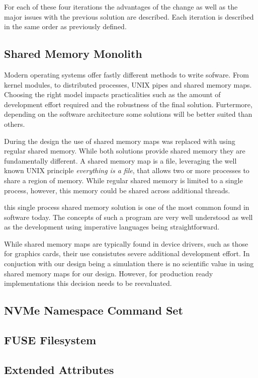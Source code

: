For each of these four iterations the advantages of the change as well as the
major issues with the previous solution are described. Each iteration is
described in the same order as previously defined.

\subsection{Shared Memory Monolith}

Modern operating systems offer fastly different methods to write sofware. From
kernel modules, to distributed processes, UNIX pipes and shared memory maps.
Choosing the right model impacts practicalities such as the amount of
development effort required and the robustness of the final solution. 
Furtermore, depending on the software architecture some solutions will be better
suited than others.

During the design the use of shared memory maps was replaced with using regular
shared memory. While both solutions provide shared memory they are fundamentally
different. A shared memory map is a file, leveraging the well known UNIX
principle \textit{everything is a file}, that allows two or more processes to
share a region of memory. While regular shared memory is limited to a single
process, however, this memory could be shared across additional threads.

this single process shared memory solution is one of the most common found in
software today. The concepts of such a program are very well understood as
well as the development using imperative languages being straightforward.

While shared memory maps are typically found in device drivers, such as those
for graphics cards, their use consistutes severe additional development effort.
In conjuction with our design being a simulation there is no scientific value in
using shared memory maps for our design. However, for production ready
implementations this decision needs to be reevaluated.

\subsection{NVMe Namespace Command Set}

\subsection{FUSE Filesystem}


\subsection{Extended Attributes}

